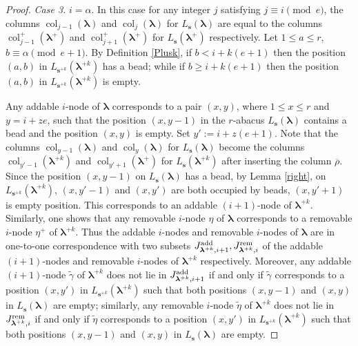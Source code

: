 \documentclass[a4paper,10pt]{amsart}
\theoremstyle{plain}
\def\bs{{\boldsymbol{s}}}
\def\blam{{\boldsymbol \lambda}}
\DeclareMathOperator{\col}{col}
\theoremstyle{plain}
\numberwithin{equation}{section}
\begin{document}
\begin{proof}
{\it Case 3.} $i=\alpha$. In this case for any integer $j$ satisfying $j\equiv i\pmod e$, the columns $\col_{j-1}(\blam)$ and $\col_j(\blam)$ for $L_\bs(\blam)$ are equal to the columns $\col^+_{j-1}(\blam^+)$ and $\col^+_{j+1}(\blam^+)$ for $L_\bs(\blam^+)$ respectively.
Let $1\le a\le r$, $b\equiv\alpha \pmod{e+1}$. By Definition \ref{Plusk}, if $b<i+k(e+1)$ then the position $(a, b)$ in $L_{\bs^{+k}}(\blam^{+k})$ has a bead; while if $b\ge i+k(e+1)$ then the position $(a, b)$ in $L_{\bs^{+k}}(\blam^{+k})$ is empty.


Any addable $i$-node of $\blam$ corresponds to a pair $(x,y)$, where $1 \le x \le r$ and $y=i+ze$, such that the position $(x, y-1)$ in the $r$-abacus $L_\bs(\blam)$ contains a bead and the position $(x, y)$ is empty.  Set $y':= i+z(e+1)$. Note that the columns $\col_{y-1}(\blam)$ and $\col_{y}(\blam)$ for $L_\bs(\blam)$ become the columns $\col_{y'-1}(\blam^{+k})$ and $\col_{y'+1}(\blam^+)$ for $L_\bs(\blam^{+k})$ after inserting the column $\overline{\rho}$. Since the position $(x, y-1)$ on $L_\bs(\blam)$ has a bead, by Lemma \ref{right}, on $L_{\bs^{+k}}(\blam^{+k})$, $(x, y'-1)$ and $(x, y')$ are both occupied by beads, $(x, y'+1)$ is empty position.
This corresponds to an addable $(i+1)$-node of $\blam^{+k}$. Similarly, one shows that any removable $i$-node $\eta$ of $\blam$ corresponds to a removable $i$-node $\eta^+$ of $\blam^{+k}$. Thus
the addable $i$-nodes and removable $i$-nodes of $\blam$ are in one-to-one correspondence with two subsets $J_{\blam^{+k},i+1}^{\rm{add}}, J_{\blam^{+k},i}^{\rm{rem}}$  of the addable $(i+1)$-nodes and removable $i$-nodes of $\blam^{+k}$ respectively. Moreover, any addable $(i+1)$-node $\tilde{\gamma}$ of $\blam^{+k}$ does not lie in $J_{\blam^{+k},i+1}^{\rm{add}}$ if and only if $\tilde{\gamma}$ corresponds to a position $(x,y')$ in $L_{\bs^{+k}}(\blam^{+k})$ such that both positions $(x, y-1)$ and $(x, y)$ in $L_\bs(\blam)$ are empty; similarly, any removable $i$-node $\tilde{\eta}$ of $\blam^{+k}$ does not lie in $J_{\blam^{+k},i}^{\rm{rem}}$ if and only if $\tilde{\eta}$ corresponds to a position  $(x,y')$ in $L_{\bs^{+k}}(\blam^{+k})$ such that both positions $(x, y-1)$ and $(x, y)$ in $L_\bs(\blam)$ are empty.



\end{proof}
\end{document}
